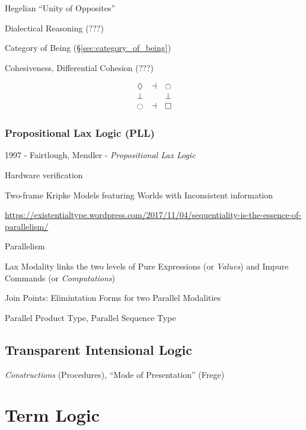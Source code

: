 Hegelian ``Unity of Opposites''

Dialectical Reasoning (???) %

Category of Being (\S\ref{sec:category_of_being})

Cohesiveness, Differential Cohesion (???)

\[
  \begin{matrix}
    \lozenge & \dashv & \ocircle \\
    \bot & \empty & \bot \\
    \ocircle & \dashv & \square
  \end{matrix}
\]



\subsubsection{Propositional Lax Logic (PLL)}\label{sec:propositional_lax_logic}

1997 - Fairtlough, Mendler - \emph{Propositional Lax Logic}

Hardware verification

Two-frame Kripke Models featuring Worlds with Inconsistent information

\url{https://existentialtype.wordpress.com/2017/11/04/sequentiality-is-the-essence-of-parallelism/}

Parallelism

Lax Modality links the two levels of Pure Expressions (or \emph{Values}) and
Impure Commands (or \emph{Computations})

Join Points: Elimintation Forms for two Parallel Modalities

Parallel Product Type, Parallel Sequence Type



\subsection{Transparent Intensional Logic}
\label{sec:transparent_intensional_logic}

\emph{Constructions} (Procedures), ``Mode of Presentation'' (Frege)



\section{Term Logic}\label{sec:term_logic}

